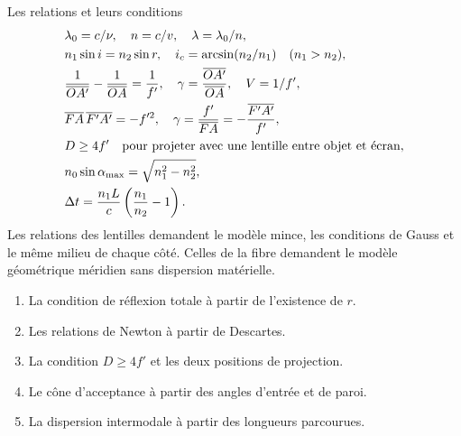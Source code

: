 \begin{loi}{Les relations et leurs conditions}
\begin{align*}
&\lambda_0=c/\nu,\quad n=c/v,\quad\lambda=\lambda_0/n,\\
&n_1\sin i=n_2\sin r,\quad i_c=\arcsin(n_2/n_1)\quad(n_1>n_2),\\
&\frac1{\overline{OA'}}-\frac1{\overline{OA}}=\frac1{f'},\quad
\gamma=\frac{\overline{OA'}}{\overline{OA}},\quad V=1/f',\\
&\overline{FA}\,\overline{F'A'}=-f'^2,\quad
\gamma=\frac{f'}{\overline{FA}}=-\frac{\overline{F'A'}}{f'},\\
&D\geq4f'\quad\text{pour projeter avec une lentille entre objet et écran},\\
&n_0\sin\alpha_{\max}=\sqrt{n_1^2-n_2^2},\\
&\Delta t=\frac{n_1L}{c}\left(\frac{n_1}{n_2}-1\right).
\end{align*}
Les relations des lentilles demandent le modèle mince, les conditions de Gauss et le même milieu de chaque côté. Celles de la fibre demandent le modèle géométrique méridien sans dispersion matérielle.
\end{loi}
\begin{enumerate}
\item La condition de réflexion totale à partir de l'existence de $r$.
\item Les relations de Newton à partir de Descartes.
\item La condition $D\geq4f'$ et les deux positions de projection.
\item Le cône d'acceptance à partir des angles d'entrée et de paroi.
\item La dispersion intermodale à partir des longueurs parcourues.
\end{enumerate}

